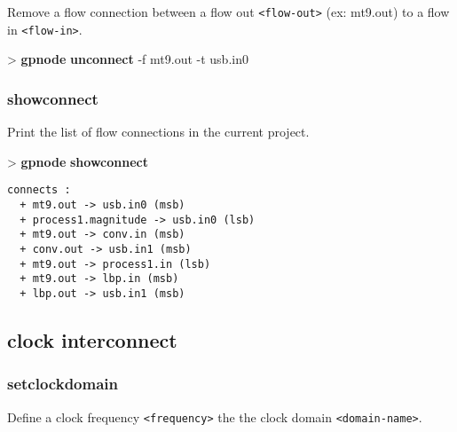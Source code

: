 \documentclass[10pt,a4paper]{article}
\begin{document}
Remove a flow connection between a flow out \texttt{<flow-out>} (ex: mt9.out) to a flow in \texttt{<flow-in>}.\\


\begin{sampletitle}
> \textbf{gpnode} \textbf{unconnect} -f mt9.out -t usb.in0
\end{sampletitle}


\subsubsection{showconnect}

Print the list of flow connections in the current project.

\begin{sampletitle}
> \textbf{gpnode} \textbf{showconnect}
\begin{Verbatim}
connects :
  + mt9.out -> usb.in0 (msb)
  + process1.magnitude -> usb.in0 (lsb)
  + mt9.out -> conv.in (msb)
  + conv.out -> usb.in1 (msb)
  + mt9.out -> process1.in (lsb)
  + mt9.out -> lbp.in (msb)
  + lbp.out -> usb.in1 (msb)
\end{Verbatim}
\end{sampletitle}


\subsection{clock interconnect}
\subsubsection{setclockdomain}

Define a clock frequency \texttt{<frequency>} the the clock domain \texttt{<domain-name>}.\\

\end{document}
